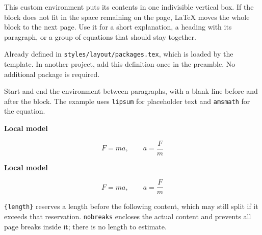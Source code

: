 \clearpage
{}
This custom environment puts its contents in one indivisible vertical box.
If the block does not fit in the space remaining on the page, LaTeX moves
the whole block to the next page. Use it for a short explanation, a heading
with its paragraph, or a group of equations that should stay together.

Already defined in \texttt{styles/layout/packages.tex}, which is
loaded by the template. In another project, add this definition once in
the preamble. No additional package is required.
\begin{referencecode}
\newenvironment{nobreaks}{\vbox\bgroup}{\egroup}
\end{referencecode}

Start and end the environment between paragraphs, with a blank line before
and after the block. The example uses \texttt{lipsum} for placeholder text
and \texttt{amsmath} for the equation.
\begin{referencecode}
\begin{nobreaks}
    \textbf{Local model}

    \lipsum[1][1-2]
    \[
        F = ma, \qquad a = \frac{F}{m}
    \]
    \lipsum[2][1]
\end{nobreaks}
\end{referencecode}

\begin{nobreaks}
    \textbf{Local model}

    \lipsum[1][1-2]
    \[
        F = ma, \qquad a = \frac{F}{m}
    \]
    \lipsum[2][1]
\end{nobreaks}

\texttt{\string\Needspace\{length\}} reserves a length before the following
content, which may still split if it exceeds that reservation.
\texttt{nobreaks} encloses the actual content and prevents all page breaks
inside it; there is no length to estimate.

